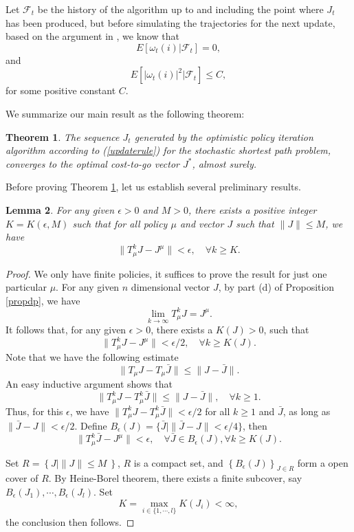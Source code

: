 \documentclass[12pt,a4paper]{amsart}
\numberwithin{equation}{section}
\theoremstyle{plain}
\newtheorem{Th}{Theorem}[section]
\newtheorem{Lemma}[Th]{Lemma}
\theoremstyle{definition}
\begin{document}
Let $\mathcal{F}_t$ be the history of the algorithm up to and including the point where $J_t$ has been produced, but before simulating the trajectories for the next update, based on the argument in \cite{Ts03}, we know that 
$$
E\left[\omega_t(i) | \mathcal{F}_t \right] = 0,
$$
and
$$
E\left[ |\omega_t(i)|^2 | \mathcal{F}_t \right] \leq C,
$$
for some positive constant $C$.  

We summarize our main result as the following theorem:
\begin{Th}\label{main}
	The sequence $J_t$ generated by the optimistic policy iteration algorithm according to (\ref{updaterule}) for the  stochastic shortest path problem,  converges to the optimal cost-to-go vector $J^*$, almost surely. 
\end{Th}

Before proving Theorem \ref{main}, let us establish several preliminary results. 

\begin{Lemma}\label{lmapprox}
	For any given $\epsilon > 0$ and $M >0$, there exists a positive integer $K = K(\epsilon, M)$ such that for all policy $\mu$ and vector $J$ such that $\|J\| \le M$, we have 
	$$
	\|T_{\mu}^k J - J^{\mu}\| < \epsilon, \quad \forall k \ge K.
	$$
\end{Lemma}
\begin{proof}
	We only have finite policies, it suffices to prove the result for just one particular $\mu$. For any given $n$ dimensional vector $J$, by part (d) of Proposition \ref{propdp}, we have
	$$
	\lim_{k \to \infty} T_{\mu}^k J = J^{\mu}.
	$$
	It follows that, for any given $\epsilon > 0$, there exists a $K(J) > 0$, such that
	$$
	\| T_{\mu}^{k}J - J^{\mu}\| < \epsilon/2, \quad \forall k \ge K(J). 
	$$
	Note that we have the following estimate 
	$$
	\|T_{\mu} J - T_{\mu} \bar{J}\| \le \| J - \bar{J}\|.
	$$
	An easy inductive argument shows that
	$$
	\|T_{\mu}^k J - T_{\mu}^{k} \bar{J}\| \le \|J -  \bar{J}\|, \quad \forall k \ge 1.
	$$
	Thus, for this $\epsilon$, we have $ \| T_{\mu}^{k} J - T_{\mu}^{k} \bar{J} \| < \epsilon/2$ for all $k \ge 1$ and $\bar{J}$, as long as $\|\bar{J} - J\| < \epsilon / 2$. Define $B_{\epsilon}(J) = \{ \bar{J} | \|\bar{J} - J\| < \epsilon/4 \}$, then 
	$$
	\| T_{\mu}^{k}\bar{J} - J^{\mu}\| < \epsilon, \quad \forall \bar{J} \in B_{\epsilon}(J),  \forall k \ge K(J). 
	$$
	
	Set $R = \left\{J | \|J\| \leq M\ \right\}$, $R$ is a compact set, and $\left\{ B_{\epsilon}(J)\right\}_{J\in R}$ form a open cover of $R$. By Heine-Borel theorem, there exists a finite subcover, say $B_{\epsilon}(J_1), \cdots, B_{\epsilon}(J_l)$. Set 
	$$
	K = \max_{i \in \{1,\cdots, l\}} K(J_i) < \infty,
	$$ 
	the conclusion then follows. 
\end{proof}
\end{document}
